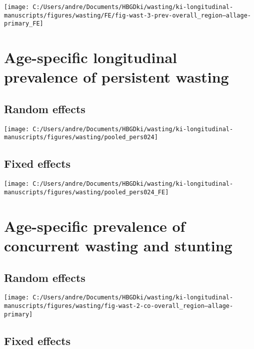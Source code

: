 \documentclass[
  9pt,
]{book}
\begin{document}
\texttt{[image: C:/Users/andre/Documents/HBGDki/wasting/ki-longitudinal-manuscripts/figures/wasting/FE/fig-wast-3-prev-overall\_region--allage-primary\_FE]}

\hypertarget{age-specific-longitudinal-prevalence-of-persistent-wasting}{%
\section{Age-specific longitudinal prevalence of persistent wasting}\label{age-specific-longitudinal-prevalence-of-persistent-wasting}}

\hypertarget{random-effects-5}{%
\subsection{Random effects}\label{random-effects-5}}

\texttt{[image: C:/Users/andre/Documents/HBGDki/wasting/ki-longitudinal-manuscripts/figures/wasting/pooled\_pers024]}

\hypertarget{fixed-effects-6}{%
\subsection{Fixed effects}\label{fixed-effects-6}}

\texttt{[image: C:/Users/andre/Documents/HBGDki/wasting/ki-longitudinal-manuscripts/figures/wasting/pooled\_pers024\_FE]}

\hypertarget{age-specific-prevalence-of-concurrent-wasting-and-stunting}{%
\section{Age-specific prevalence of concurrent wasting and stunting}\label{age-specific-prevalence-of-concurrent-wasting-and-stunting}}

\hypertarget{random-effects-6}{%
\subsection{Random effects}\label{random-effects-6}}

\texttt{[image: C:/Users/andre/Documents/HBGDki/wasting/ki-longitudinal-manuscripts/figures/wasting/fig-wast-2-co-overall\_region--allage-primary]}

\hypertarget{fixed-effects-7}{%
\subsection{Fixed effects}\label{fixed-effects-7}}
\end{document}
